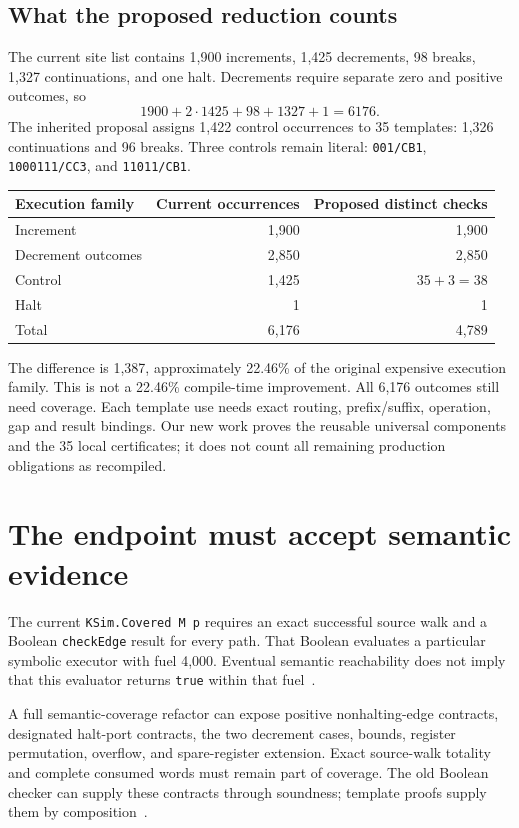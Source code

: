 \subsection{What the proposed reduction counts}
The current site list contains 1,900 increments, 1,425 decrements, 98 breaks, 1,327 continuations, and one halt. Decrements require separate zero and positive outcomes, so
\[
1900+2\cdot1425+98+1327+1=6176.
\]
The inherited proposal assigns 1,422 control occurrences to 35 templates: 1,326 continuations and 96 breaks. Three controls remain literal: \texttt{001/CB1}, \texttt{1000111/CC3}, and \texttt{11011/CB1}.
\begin{center}
\begin{tabular}{@{}lrr@{}}
\toprule Execution family & Current occurrences & Proposed distinct checks\\\midrule
Increment & 1,900 & 1,900\\
Decrement outcomes & 2,850 & 2,850\\
Control & 1,425 & $35+3=38$\\
Halt & 1 & 1\\\midrule
Total & 6,176 & 4,789\\\bottomrule
\end{tabular}
\end{center}
The difference is 1,387, approximately 22.46\% of the original expensive execution family. This is not a 22.46\% compile-time improvement. All 6,176 outcomes still need coverage. Each template use needs exact routing, prefix/suffix, operation, gap and result bindings. Our new work proves the reusable universal components and the 35 local certificates; it does not count all remaining production obligations as recompiled.

\section{The endpoint must accept semantic evidence}
The current \texttt{KSim.Covered M p} requires an exact successful source walk and a Boolean \texttt{checkEdge} result for every path. That Boolean evaluates a particular symbolic executor with fuel 4,000. Eventual semantic reachability does not imply that this evaluator returns \texttt{true} within that fuel~\cite{sim}.

A full semantic-coverage refactor can expose positive nonhalting-edge contracts, designated halt-port contracts, the two decrement cases, bounds, register permutation, overflow, and spare-register extension. Exact source-walk totality and complete consumed words must remain part of coverage. The old Boolean checker can supply these contracts through soundness; template proofs supply them by composition~\cite{intake215}.

